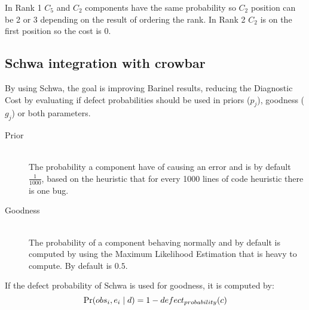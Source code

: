 In Rank 1 \(C_5\) and \(C_2\) components have the same probability so \(C_2\) position can be 2 or 3 depending on the result of ordering the rank. In Rank 2 \(C_2\)  is on the first position so the cost is 0.

\subsection{Schwa integration with crowbar}
By using Schwa, the goal is improving Barinel results, reducing the Diagnostic Cost by evaluating if defect probabilities should be used in priors ($p_j$), goodness ($g_j$) or both parameters. 

\begin{description}
\item[Prior] \hfill \\
The probability a component have of causing an error and is by default \( \frac{1}{1000} \), based on the heuristic that for every 1000 lines of code heuristic there is one bug. 
\item[Goodness] \hfill \\
The probability of a component behaving normally and by default is computed by using the Maximum Likelihood Estimation that is heavy to compute. By default is $0.5$.
\end{description}

If the defect probability of Schwa is used for goodness, it is computed by:
\begin{equation}
\mbox{Pr}(obs_i,e_i \mid d) = 1 - defect_{probability}(c)
\end{equation}
